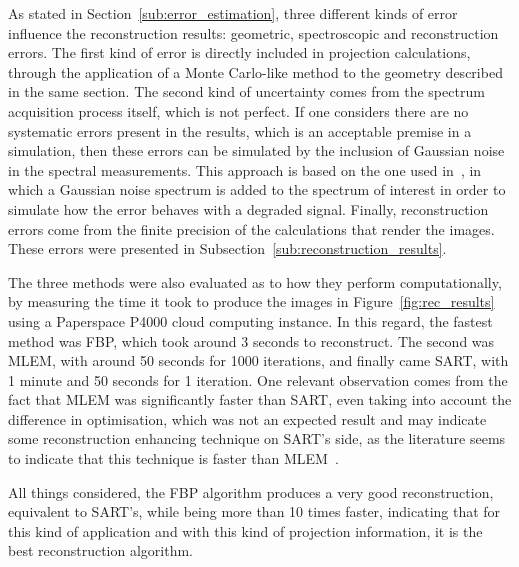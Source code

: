 As stated in Section~\ref{sub:error_estimation}, three different kinds
of error influence the reconstruction results: geometric, spectroscopic
and reconstruction errors. The first kind of error is directly included
in projection calculations, through the application of a Monte
Carlo-like method to the geometry described in the same section. The
second kind of uncertainty comes from the spectrum acquisition process
itself, which is not perfect.  If one considers there are no systematic
errors present in the results, which is an acceptable premise in a
simulation, then these errors can be simulated by the inclusion of
Gaussian noise in the spectral measurements. This approach is based on
the one used in~\cite{Stutz1996}, in which a Gaussian noise spectrum is
added to the spectrum of interest in order to simulate how the error
behaves with a degraded signal. Finally, reconstruction errors come from
the finite precision of the calculations that render the images. These
errors were presented in Subsection~\ref{sub:reconstruction_results}.

The three methods were also evaluated as to how they perform
computationally, by measuring the time it took to produce the images in
Figure~\ref{fig:rec_results} using a Paperspace P4000 cloud computing
instance. In this regard, the fastest method was FBP, which took around
3 seconds to reconstruct. The second was MLEM, with around 50 seconds
for 1000 iterations, and finally came SART, with 1 minute and 50 seconds
for 1 iteration. One relevant observation comes from the fact that MLEM
was significantly faster than SART, even taking into account the
difference in optimisation, which was not an expected result and may
indicate some reconstruction enhancing technique on SART's side, as the
literature seems to indicate that this technique is faster than
MLEM~\cite{Defrise2003}.

All things considered, the FBP algorithm produces a very good
reconstruction, equivalent to SART's, while being more than 10 times
faster, indicating that for this kind of application and with this kind
of projection information, it is the best reconstruction algorithm.
